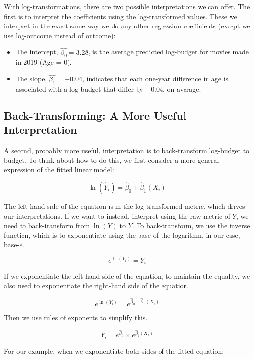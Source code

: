 \documentclass[]{book}
\providecommand{\tightlist}{%
  \setlength{\itemsep}{0pt}\setlength{\parskip}{0pt}}
\begin{document}
With log-transformations, there are two possible interpretations we can offer. The first is to interpret the coefficients using the log-transformed values. These we interpret in the exact same way we do any other regression coefficients (except we use log-outcome instead of outcome):

\begin{itemize}
\tightlist
\item
  The intercept, \(\hat{\beta_0} = 3.28\), is the average predicted log-budget for movies made in 2019 (Age = 0).
\item
  The slope, \(\hat{\beta_1} = -0.04\), indicates that each one-year difference in age is associated with a log-budget that differ by \(-0.04\), on average.
\end{itemize}

\hypertarget{back-transforming-a-more-useful-interpretation}{%
\subsection{Back-Transforming: A More Useful Interpretation}\label{back-transforming-a-more-useful-interpretation}}

A second, probably more useful, interpretation is to back-transform log-budget to budget. To think about how to do this, we first consider a more general expression of the fitted linear model:

\[
\ln\left(\hat{Y}_i\right) = \hat\beta_0 + \hat\beta_1(X_{i})
\]

The left-hand side of the equation is in the log-transformed metric, which drives our interpretations. If we want to instead, interpret using the raw metric of \(Y\), we need to back-transform from \(\ln(Y)\) to \(Y\). To back-transform, we use the inverse function, which is to exponentiate using the base of the logarithm, in our case, base-\(e\).

\[
e^{\ln(Y_i)} = Y_i
\]

If we exponentiate the left-hand side of the equation, to maintain the equality, we also need to exponentiate the right-hand side of the equation.

\[
e^{\ln(Y_i)} = e^{\hat\beta_0 + \hat\beta_1(X_{i})}
\]

Then we use rules of exponents to simplify this.

\[
Y_i = e^{\hat\beta_0} \times e^{\hat\beta_1(X_{i})}
\]

For our example, when we exponentiate both sides of the fitted equation:
\end{document}
